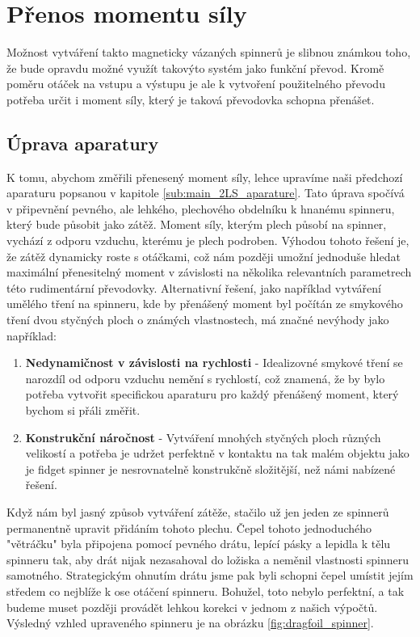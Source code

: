 \chapter{Přenos momentu síly}

Možnost vytváření takto magneticky vázaných spinnerů je slibnou známkou toho, že bude opravdu možné využít takovýto systém jako funkční převod. Kromě poměru otáček na vstupu a výstupu je ale k vytvoření použitelného převodu potřeba určit i moment síly, který je taková převodovka schopna přenášet.

\section{Úprava aparatury}

K tomu, abychom změřili přenesený moment síly, lehce upravíme naši předchozí aparaturu popsanou v kapitole \ref{sub:main_2LS_aparature}. Tato úprava spočívá v připevnění pevného, ale lehkého, plechového obdelníku k hnanému spinneru, který bude působit jako zátěž. Moment síly, kterým plech působí na spinner, vychází z odporu vzduchu, kterému je plech podroben. Výhodou tohoto řešení je, že zátěž dynamicky roste s otáčkami, což nám později umožní jednoduše hledat maximální přenesitelný moment v závislosti na několika relevantních parametrech této rudimentární převodovky. Alternativní řešení, jako například vytváření umělého tření na spinneru, kde by přenášený moment byl počítán ze smykového tření dvou styčných ploch o známých vlastnostech, má značné nevýhody jako například: 

\begin{enumerate}[topsep=0pt, partopsep=0pt]
    \setlength{\itemsep}{0pt}%
    \setlength{\parskip}{0pt}%
    \item \textbf{Nedynamičnost v závislosti na rychlosti} - Idealizovné smykové tření se narozdíl od odporu vzduchu nemění s rychlostí, což znamená, že by bylo potřeba vytvořit specifickou aparaturu pro každý přenášený moment, který bychom si přáli změřit.
    \item \textbf{Konstrukční náročnost} - Vytváření mnohých styčných ploch různých velikostí a potřeba je udržet perfektně v kontaktu na tak malém objektu jako je fidget spinner je nesrovnatelně konstrukčně složitější, než námi nabízené řešení.
\end{enumerate}

Když nám byl jasný způsob vytváření zátěže, stačilo už jen jeden ze spinnerů permanentně upravit přidáním tohoto plechu. Čepel tohoto jednoduchého "větráčku" byla připojena pomocí pevného drátu, lepící pásky a lepidla k tělu spinneru tak, aby drát nijak nezasahoval do ložiska a neměnil vlastnosti spinneru samotného. Strategickým ohnutím drátu jsme pak byli schopni čepel umístit jejím středem co nejblíže k ose otáčení spinneru. Bohužel, toto nebylo perfektní, a tak budeme muset později provádět lehkou korekci v jednom z našich výpočtů.
Výsledný vzhled upraveného spinneru je na obrázku \ref{fig:dragfoil_spinner}.

